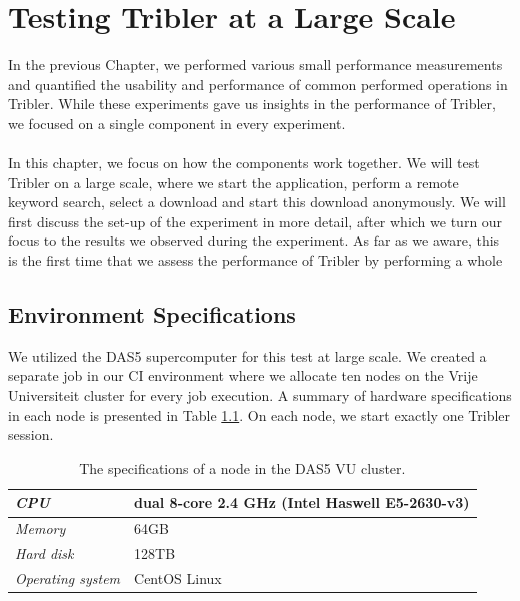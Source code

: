 \chapter{Testing Tribler at a Large Scale}
In the previous Chapter, we performed various small performance measurements and quantified the usability and performance of common performed operations in Tribler. While these experiments gave us insights in the performance of Tribler, we focused on a single component in every experiment.\\\\
In this chapter, we focus on how the components work together. We will test Tribler on a large scale, where we start the application, perform a remote keyword search, select a download and start this download anonymously. We will first discuss the set-up of the experiment in more detail, after which we turn our focus to the results we observed during the experiment. As far as we aware, this is the first time that we assess the performance of Tribler by performing a whole 

\section{Environment Specifications}
We utilized the DAS5 supercomputer for this test at large scale. We created a separate job in our CI environment where we allocate ten nodes on the Vrije Universiteit cluster for every job execution. A summary of hardware specifications in each node is presented in Table \ref{table:das5-node-specifications}. On each node, we start exactly one Tribler session.

\begin{table}[h!]
	\centering
	\begin{tabular}{|l|l|}
		\hline
		\emph{CPU} & dual 8-core 2.4 GHz (Intel Haswell E5-2630-v3)\\ \hline
		\emph{Memory} & 64GB \\ \hline
		\emph{Hard disk} & 128TB \\ \hline
		\emph{Operating system} & CentOS Linux \\ \hline
	\end{tabular}
	\caption{The specifications of a node in the DAS5 VU cluster.}
	\label{table:das5-node-specifications}
\end{table}

